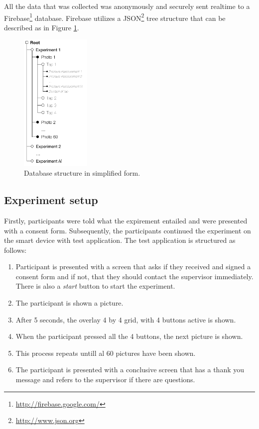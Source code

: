 \documentclass{sig-alternate}
\begin{document}
All the data that was collected was anonymously and securely sent realtime to a Firebase\footnote{\url{http://firebase.google.com/}} database. Firebase utilizes a JSON\footnote{\url{http://www.json.org}} tree structure that can be described as in Figure \ref{fig:datastructure}.
\begin{figure}[h]
    \centering
    \includegraphics[width=0.3\textwidth]{images/Datastructure.png}
    \caption{Database structure in simplified form.}
    \label{fig:datastructure}
\end{figure}


\subsection{Experiment setup} %
\label{sub:experiment_setup}
Firstly, participants were told what the expirement entailed and were presented with a consent form. Subsequently, the participants continued the experiment on the smart device with test application. The test application is structured as follows:
\begin{enumerate}
	\item Participant is presented with a screen that asks if they received and signed a consent form and if not, that they should contact the supervisor immediately. There is also a \textit{start} button to start the experiment.
	\item The participant is shown a picture.
	\item After 5 seconds, the overlay 4 by 4 grid, with 4 buttons active is shown.
	\item When the participant pressed all the 4 buttons, the next picture is shown.
	\item This process repeats untill al 60 pictures have been shown.
	\item The participant is presented with a conclusive screen that has a thank you message and refers to the supervisor if there are questions.
\end{enumerate}
\end{document}
